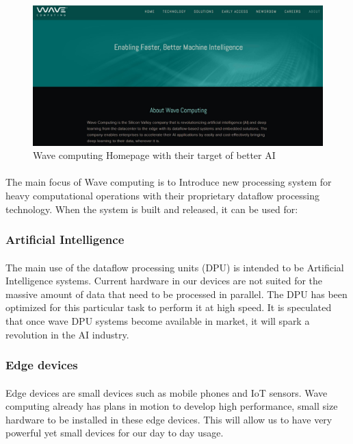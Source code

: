 \begin{figure}[h]
    \centering
    \includegraphics[trim=0cm 0cm 0cm 0cm, clip=true,scale=0.25]{figures/wave_site.jpg}
    \caption{Wave computing Homepage with their target of better AI\label{Fig:wavesite}}\vspace{-4mm}
    \end{figure}

\paragraph{}
The main focus of Wave computing is to Introduce new processing system for heavy computational operations with their proprietary dataflow processing technology. When the system is built and released, it can be used for:

\subsubsection*{Artificial Intelligence}
\paragraph{}
The main use of the dataflow processing units (DPU) is intended to be Artificial Intelligence systems. Current hardware in our devices are not suited for the massive amount of data that need to be processed in parallel. The DPU has been optimized for this particular task to perform it at high speed. It is speculated that once wave DPU systems become available in market, it will spark a revolution in the AI industry.

\subsubsection*{Edge devices}
\paragraph{}
Edge devices are small devices such as mobile phones and IoT sensors. Wave computing already has plans in motion to develop high performance, small size hardware to be installed in these edge devices. This will allow us to have very powerful yet small devices for our day to day usage.

